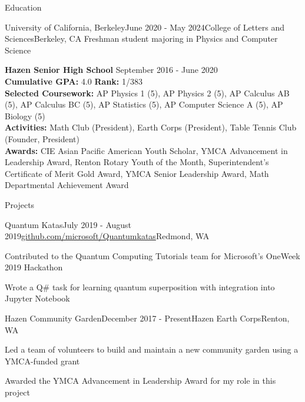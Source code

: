 \documentclass{resume} %
\begin{document}
\begin{rSection}{Education}
    \begin{rSubsection}{University of California, Berkeley}{June 2020 - May 2024}{College of Letters and Sciences}{Berkeley, CA}
        Freshman student majoring in Physics and Computer Science
        \end{rSubsection}

{\bf Hazen Senior High School} \hfill {September 2016 - June 2020}\\
{\bf Cumulative GPA:} 4.0 {\bf Rank:} 1/383 \smallskip \\
{\bf Selected Coursework:} AP Physics 1 (5), AP Physics 2 (5), AP Calculus AB (5), AP Calculus BC (5), AP Statistics (5), AP Computer Science A (5), AP Biology (5)\\
{\bf Activities:} Math Club (President), Earth Corps (President), Table Tennis Club (Founder, President)\\
{\bf Awards:} CIE Asian Pacific American Youth Scholar, YMCA Advancement in Leadership Award,  Renton Rotary Youth of the Month, Superintendent's Certificate of Merit Gold Award, YMCA Senior Leadership Award, Math Departmental Achievement Award

\end{rSection}


\begin{rSection}{Projects}

\begin{rSubsection}{Quantum Katas}{July 2019 - August 2019}{\href{https://github.com/microsoft/QuantumKatas}{github.com/microsoft/Quantumkatas}}{Redmond, WA}
\item Contributed to the Quantum Computing Tutorials team for Microsoft's OneWeek 2019 Hackathon
\item Wrote a Q\# task for learning quantum superposition with integration into Jupyter Notebook
\end{rSubsection}

\begin{rSubsection}{Hazen Community Garden}{December 2017 - Present}{Hazen Earth Corps}{Renton, WA}
\item Led a team of volunteers to build and maintain a new community garden using a YMCA-funded grant
\item Awarded the YMCA Advancement in Leadership Award for my role in this project
\end{rSubsection}

\end{rSection}
\end{document}
